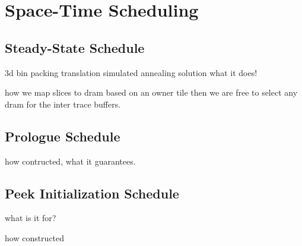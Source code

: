\section{Space-Time Scheduling}
\label{sec:scheduling}
\subsection{Steady-State Schedule}
3d bin packing translation
simulated annealing solution
what it does!

how we map slices to dram based on an owner tile then we 
are free to select any dram for the inter trace buffers.

\subsection{Prologue Schedule}
how contructed, what it guarantees.

\subsection{Peek Initialization Schedule}
what is it for?

how constructed



